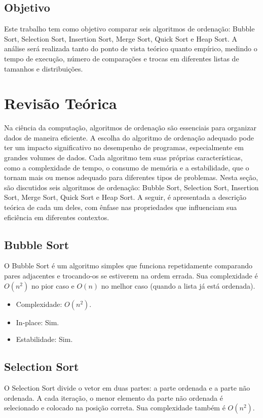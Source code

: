 \documentclass[tcc2]{uftex}
\begin{document}
\section{Objetivo}
Este trabalho tem como objetivo comparar seis algoritmos de ordenação: Bubble Sort, Selection Sort, Insertion Sort, Merge Sort, Quick Sort e Heap Sort. A análise será realizada tanto do ponto de vista teórico quanto empírico, medindo o tempo de execução, número de comparações e trocas em diferentes listas de tamanhos e distribuições.


\chapter{Revisão Teórica}

Na ciência da computação, algoritmos de ordenação são essenciais para organizar dados de maneira eficiente. A escolha do algoritmo de ordenação adequado pode ter um impacto significativo no desempenho de programas, especialmente em grandes volumes de dados. Cada algoritmo tem suas próprias características, como a complexidade de tempo, o consumo de memória e a estabilidade, que o tornam mais ou menos adequado para diferentes tipos de problemas. Nesta seção, são discutidos seis algoritmos de ordenação: Bubble Sort, Selection Sort, Insertion Sort, Merge Sort, Quick Sort e Heap Sort. A seguir, é apresentada a descrição teórica de cada um deles, com ênfase nas propriedades que influenciam sua eficiência em diferentes contextos.

\section{Bubble Sort}
O Bubble Sort é um algoritmo simples que funciona repetidamente comparando pares adjacentes e trocando-os se estiverem na ordem errada. Sua complexidade é \(O(n^2)\) no pior caso e \(O(n)\) no melhor caso (quando a lista já está ordenada).

\begin{itemize}
    \item Complexidade: \(O(n^2)\).
    \item In-place: Sim.
    \item Estabilidade: Sim.
\end{itemize}

\section{Selection Sort}
O Selection Sort divide o vetor em duas partes: a parte ordenada e a parte não ordenada. A cada iteração, o menor elemento da parte não ordenada é selecionado e colocado na posição correta. Sua complexidade também é \(O(n^2)\).
\end{document}
